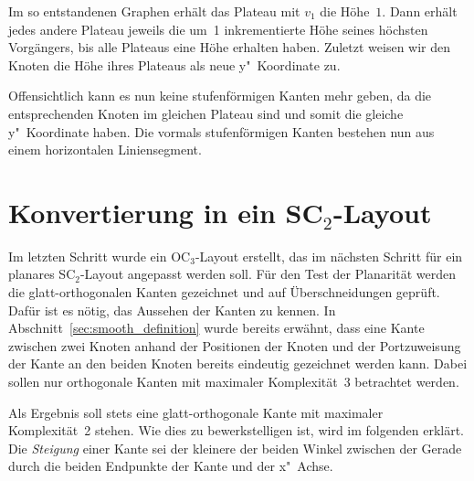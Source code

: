 \documentclass[a4paper]{scrreprt}
\theoremstyle{definition}
\begin{document}
Im so entstandenen Graphen erhält das Plateau mit $v_1$ die Höhe~$1$. Dann erhält jedes andere Plateau jeweils die um~1 inkrementierte Höhe seines höchsten Vorgängers, bis alle Plateaus eine Höhe erhalten haben. Zuletzt weisen wir den Knoten die Höhe ihres Plateaus als neue y"~Koordinate zu.

Offensichtlich kann es nun keine stufenförmigen Kanten mehr geben, da die entsprechenden Knoten im gleichen Plateau sind und somit die gleiche y"~Koordinate haben. Die vormals stufenförmigen Kanten bestehen nun aus einem horizontalen Liniensegment.

\section{Konvertierung in ein SC$_2$-Layout}
\label{sec:sc2conversion}

Im letzten Schritt wurde ein OC$_3$-Layout erstellt, das im nächsten Schritt für ein planares SC$_2$-Layout angepasst werden soll. Für den Test der Planarität werden die glatt-orthogonalen Kanten gezeichnet und auf Überschneidungen geprüft. Dafür ist es nötig, das Aussehen der Kanten zu kennen. In Abschnitt~\ref{sec:smooth_definition} wurde bereits erwähnt, dass eine Kante zwischen zwei Knoten anhand der Positionen der Knoten und der Portzuweisung der Kante an den beiden Knoten bereits eindeutig gezeichnet werden kann. Dabei sollen nur orthogonale Kanten mit maximaler Komplexität~3 betrachtet werden.

Als Ergebnis soll stets eine glatt-orthogonale Kante mit maximaler Komplexität~2 stehen. Wie dies zu bewerkstelligen ist, wird im folgenden erklärt. Die \emph{Steigung} einer Kante sei der kleinere der beiden Winkel zwischen der Gerade durch die beiden Endpunkte der Kante und der x"~Achse.
\end{document}
